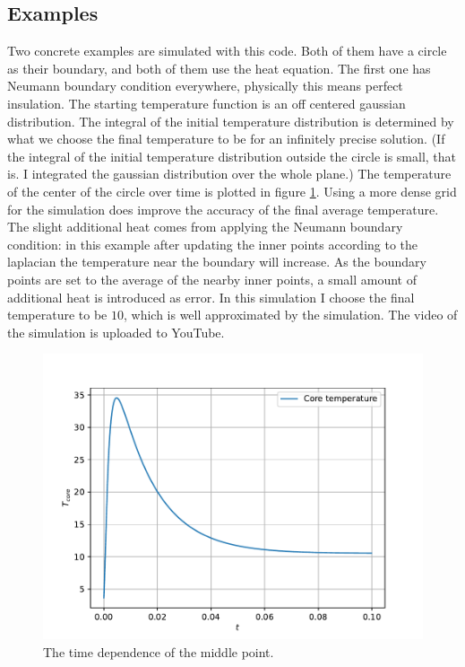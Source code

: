 \documentclass[pdftex,12pt,a4paper]{article}
\begin{document}
	\subsection{Examples}
		Two concrete examples are simulated with this code. Both of them have a circle as their boundary, and both of them use the heat equation. The first one has Neumann boundary condition everywhere, physically this means perfect insulation. The starting temperature function is an off centered gaussian distribution. The integral of the initial temperature distribution is determined by what we choose the final temperature to be for an infinitely precise solution. (If the integral of the initial temperature distribution outside the circle is small, that is. I integrated the gaussian distribution over the whole plane.) The temperature of the center of the circle over time is plotted in figure \ref{timepdf}. Using a more dense grid for the simulation does improve the accuracy of the final average temperature. The slight additional heat comes from applying the Neumann boundary condition: in this example after updating the inner points according to the laplacian the temperature near the boundary will increase. As the boundary points are set to the average of the nearby inner points, a small amount of additional heat is introduced as error. In this simulation I choose the final temperature to be $10$, which is well approximated by the simulation. The video of the simulation is uploaded to YouTube. \cite{gaussian}
		\begin{figure}[H]
			\centering
			\includegraphics[scale=1]{./figs/time.pdf}
			\caption{The time dependence of the middle point.}
			\label{timepdf}
		\end{figure}
		
\end{document}
